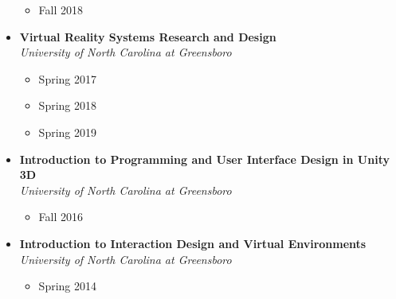 \documentclass[wideaddress]{vitae}
\begin{document}
\begin{itemize}
        \begin{itemize}
            \item Fall 2018
        \end{itemize}
        \item \textbf{Virtual Reality Systems Research and Design}						\\\textit{University of North Carolina at Greensboro}
        \begin{itemize}
            \item Spring 2017
            \item Spring 2018
            \item Spring 2019
        \end{itemize}
        \item \textbf{Introduction to Programming and User Interface Design in Unity 3D}\\\textit{University of North Carolina at Greensboro}
        \begin{itemize}
            \item Fall 2016
        \end{itemize}
        \item \textbf{Introduction to Interaction Design and Virtual Environments}   	\\\textit{University of North Carolina at Greensboro}
        \begin{itemize}
            \item Spring 2014
        \end{itemize}
\end{itemize}
\end{document}
